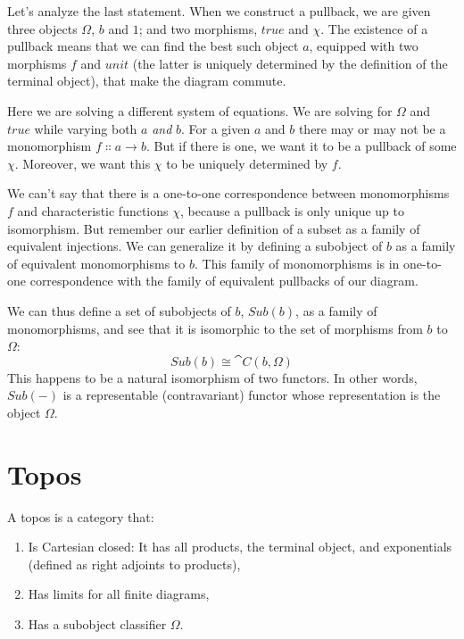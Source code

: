 Let's analyze the last statement. When we construct a pullback, we are
given three objects $\Omega$, $b$ and $1$; and two
morphisms, $\mathit{true}$ and $\chi$. The existence of a pullback
means that we can find the best such object $a$, equipped with
two morphisms $f$ and $\mathit{unit}$ (the latter is uniquely
determined by the definition of the terminal object), that make the
diagram commute.

Here we are solving a different system of equations. We are solving for
$\Omega$ and $\mathit{true}$ while varying both $a$ \emph{and}
$b$. For a given $a$ and $b$ there may or may not
be a monomorphism $f \Colon a \to b$. But if there is one, we
want it to be a pullback of some $\chi$. Moreover, we want this
$\chi$ to be uniquely determined by $f$.

We can't say that there is a one-to-one correspondence between
monomorphisms $f$ and characteristic functions $\chi$,
because a pullback is only unique up to isomorphism. But remember our
earlier definition of a subset as a family of equivalent injections. We
can generalize it by defining a subobject of $b$ as a family of
equivalent monomorphisms to $b$. This family of monomorphisms is
in one-to-one correspondence with the family of equivalent pullbacks of
our diagram.

We can thus define a set of subobjects of $b$, $\mathit{Sub}(b)$,
as a family of monomorphisms, and see that it is isomorphic to the set
of morphisms from $b$ to $\Omega$:
\[\mathit{Sub}(b) \cong \cat{C}(b, \Omega)\]
This happens to be a natural isomorphism of two functors. In other
words, $\mathit{Sub}(-)$ is a representable (contravariant) functor whose
representation is the object $\Omega$.

\section{Topos}

A topos is a category that:

\begin{enumerate}
  \tightlist
  \item
        Is Cartesian closed: It has all products, the terminal object, and
        exponentials (defined as right adjoints to products),
  \item
        Has limits for all finite diagrams,
  \item
        Has a subobject classifier $\Omega$.
\end{enumerate}

